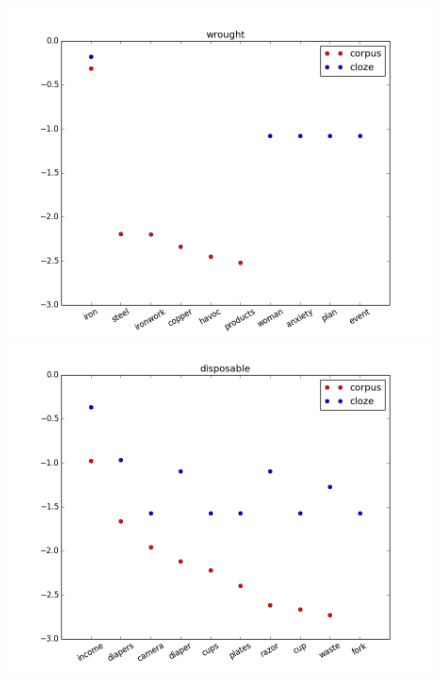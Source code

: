 \documentclass{article}
\begin{document}
\begin{figure}
	\centering
	\begin{minipage}{0.33\textwidth}
		\centering
    		\includegraphics[width=\textwidth]{figures/wrought_dist}
	\end{minipage}%
	\begin{minipage}{0.33\textwidth}
		\centering
    		\includegraphics[width=\textwidth]{figures/disposable_dist}
	\end{minipage}
    \begin{minipage}{0.33\textwidth}
		\centering

\end{minipage}
\end{figure}
\end{document}
